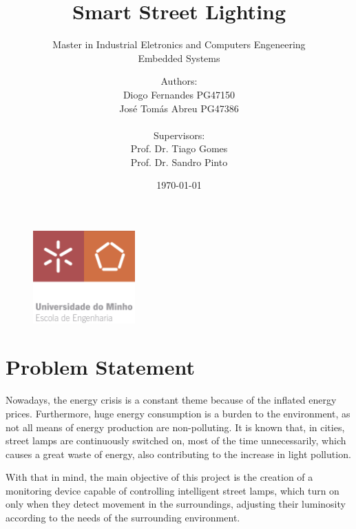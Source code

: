 \documentclass[12pt, letterpaper]{article}
\title{\textbf{Smart Street Lighting}}
\subtitle{{\large Master in Industrial Eletronics and Computers Engeneering} \\ {\large Embedded Systems}}
\author{Authors:\\Diogo Fernandes PG47150\\José Tomás Abreu PG47386\\ \\ Supervisors:\\Prof. Dr. Tiago Gomes\\Prof. Dr. Sandro Pinto}
\date{\today}
\begin{document}
{\begin{figure}[t]
	\centering
	\includegraphics[width=0.35\textwidth]{EEUMLOGO}
\end{figure}}

\maketitle

\clearpage
\section{Problem Statement}
Nowadays, the energy crisis is a constant theme because of the inflated energy prices. Furthermore, huge energy consumption is a burden to the environment, as not all means of energy production are non-polluting. It is known that, in cities, street lamps are continuously switched on, most of the time unnecessarily, which causes a great waste of energy, also contributing to the increase in light pollution.
	
With that in mind, the main objective of this project is the creation of a monitoring device capable of controlling intelligent street lamps, which turn on only when they detect movement in the surroundings, adjusting their luminosity according to the needs of the surrounding environment.



\end{document}
